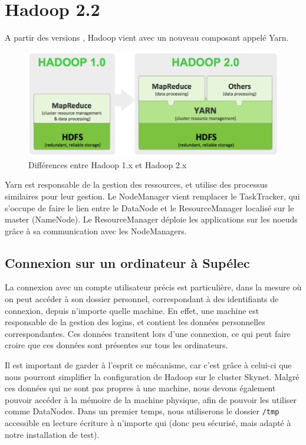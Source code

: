 \section{Hadoop 2.2}
\label{sec:hadoop-2.2}

\par A partir des versions , Hadoop vient avec un nouveau composant appelé Yarn. 

\begin{figure}[h!]
  \centering
  \includegraphics[width=12cm]{images/yarn.png}
  \caption{Différences entre Hadoop 1.x et Hadoop 2.x}
  \label{fig:yarn}
\end{figure}

Yarn est responsable de la gestion des ressources, et utilise des processus similaires pour leur gestion. Le NodeManager vient remplacer le TaskTracker, qui s'occupe de faire le lien entre le DataNode et le ResourceManager localisé sur le master (NameNode). Le ResourceManager déploie les applications sur les noeuds grâce à sa communication avec les NodeManagers.

\subsection{Connexion sur un ordinateur à Supélec}
\label{sec:connexion-sur-un}

\par La connexion avec un compte utilisateur précis est particulière, dans la mesure où on peut accéder à son dossier personnel, correspondant à des identifiants de connexion, depuis n'importe quelle machine. En effet, une machine est responsable de la gestion des logins, et contient les données personnelles correspondantes. Ces données transitent lors d'une connexion, ce qui peut faire croire que ces données sont présentes sur tous les ordinateurs.

\par Il est important de garder à l'esprit ce mécanisme, car c'est grâce à celui-ci que nous pourront simplifier la configuration de Hadoop sur le cluster Skynet. Malgré ces données qui ne sont pas propres à une machine, nous devons également pouvoir accéder à la mémoire de la machine physique, afin de pouvoir les utiliser comme DataNodes. Dans un premier temps, nous utiliserons le dossier \texttt{/tmp} accessible en lecture écriture à n'importe qui (donc peu sécurisé, mais adapté à notre installation de test).

